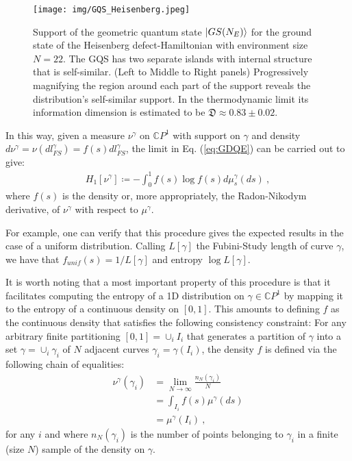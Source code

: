\documentclass[draft,nofootinbib,pre,twocolumn,showkeys,superscriptaddress,preprintnumbers,floatfix]{revtex4-1}
\newcommand{\1}{\mathbbm{1}}
\begin{document}
\begin{figure*}[hbt]
\centering
\texttt{[image: img/GQS\_Heisenberg.jpeg]}
\caption{Support of the geometric quantum state $\ket{GS(N_E)}$ for the ground
	state of the Heisenberg defect-Hamiltonian with environment size $N=22$.
	The GQS has two separate islands with internal structure that is
	self-similar. (Left to Middle to Right panels) Progressively magnifying the
	region around each part of the support reveals the distribution's
	self-similar support. In the thermodynamic limit its information dimension
	is estimated to be $\mathfrak{D} \approx 0.83 \pm 0.02$.
	}
\label{fig:GQS_HeisenbergDefect} 
\end{figure*}

In this way, given a measure $\nu^\gamma$ on $\mathbb{C}P^1$ with support on
$\gamma$ and density $d\nu^\gamma = \nu(dl^\gamma_{FS}) = f(s) dl^\gamma_{FS}$,
the limit in Eq. (\ref{eq:GDQE}) can be carried out to give:
\begin{align*}
H_1[\nu^\gamma] \coloneqq -\int_0^1 f(s)\log f(s) d\mu_s^\gamma(ds)
  ~,
\end{align*}
where $f(s)$ is the density or, more appropriately, the Radon-Nikodym
derivative, of $\nu^\gamma$ with respect to $\mu^\gamma$.

For example, one can verify that this procedure gives the expected results in
the case of a uniform distribution. Calling $L[\gamma]$ the Fubini-Study length
of curve $\gamma$, we have that $f_{unif}(s) = 1 / L[\gamma]$ and entropy
$\log L[\gamma]$.

It is worth noting that a most important property of this procedure is that it
facilitates computing the entropy of a 1D distribution on $\gamma \in
\mathbb{C}P^1$ by mapping it to the entropy of a continuous density on
$[0,1]$. This amounts to defining $f$ as the continuous density that satisfies
the following consistency constraint: For any arbitrary finite partitioning
$[0,1]=\cup_{i}I_i$ that generates a partition of $\gamma$ into a set $\gamma =
\cup_i \gamma_i$ of $N$ adjacent curves $\gamma_i = \gamma(I_i)$, the density
$f$ is defined via the following chain of equalities:
\begin{align*}
\nu^\gamma(\gamma_i) & = \lim_{N \to \infty} \frac{n_N(\gamma_i)}{N} \\
  & = \int_{I_i} f(s)\mu^{\gamma}(ds) \\
  & = \mu^\gamma(I_i) 
  ~,
\end{align*}
for any $i$ and where $n_N(\gamma_i)$ is the number of points belonging to
$\gamma_i$ in a finite (size $N$) sample of the density on $\gamma$.
\end{document}
